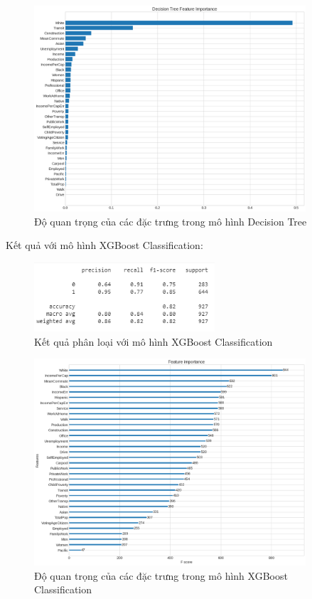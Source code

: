 \documentclass[14pt, a4paper]{article}
\numberwithin{equation}{section}
\numberwithin{figure}{section}
\numberwithin{dl}{section}
\numberwithin{md}{section}
\numberwithin{bd}{section}
\numberwithin{dn}{section}
\numberwithin{hq}{section}
\begin{document}
    \begin{figure}[h!]
        \centering
        \includegraphics[width=0.9\textwidth]{figures/Decision_Tree_Feature_Importance.png}
        \caption{Độ quan trọng của các đặc trưng trong mô hình Decision Tree}
    \end{figure}

    Kết quả với mô hình XGBoost Classification:

    \begin{figure}[h!]
        \centering
        \includegraphics[width=0.6\textwidth]{figures/XGBoost_Classifier_Report.png}
        \caption{Kết quả phân loại với mô hình XGBoost Classification}
    \end{figure}

    \begin{figure}[h!]
        \centering
        \includegraphics[width=0.9\textwidth]{figures/XGBoost_Regression_Feature_Importance.png}
        \caption{Độ quan trọng của các đặc trưng trong mô hình XGBoost Classification}
    \end{figure}
\end{document}
